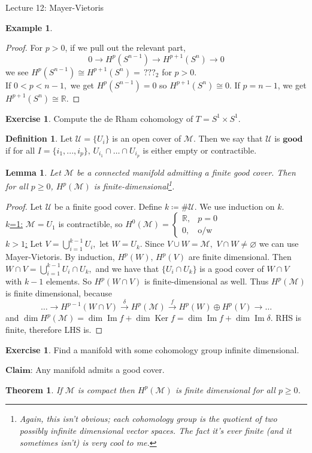 \documentclass[10pt]{article}
\theoremstyle{plain}
\newtheorem{theorem}{Theorem}[section]
\newtheorem{lemma}[thm]{Lemma}
\theoremstyle{definition}
\newtheorem{defn}[thm]{Definition} %
\newtheorem{exmp}[thm]{Example} %
\newtheorem{exercise}[thm]{Exercise}
\newcommand{\Claim}{\textbf{Claim: }}
\newcommand{\Real}{\mathbb{R}}
\newcommand{\man}{\mathcal{M}}
\newcommand{\allthe}[3]{{#1}_{#2},...,{#1}_{#3}}
\DeclareMathOperator{\Ker}{Ker}
\DeclareMathOperator{\Ima}{Im}
\newcommand{\cohomman}[1]{H^{#1}(\man)}
\newcommand{\cohom}[2]{H^{#1}(#2)}
\begin{document}
\begin{section}{Lecture 12: Mayer-Vietoris}
\begin{exmp}
\begin{proof}
For $p>0$, if we pull out the relevant part,
$$ 0 \to \cohom{p}{S^{n-1}} \to \cohom{p+1}{S^n} \to 0$$
we see $\cohom{p}{S^{n-1}} \cong \cohom{p+1}{S^n}  = \, ???_2$ for $p > 0$. \\
If $ 0 < p < n-1,$ we get $\cohom{p}{S^{n-1}} = 0$ so $\cohom{p+1}{S^n} \cong 0$. If $p = n-1$, we get $\cohom{p+1}{S^n} \cong \Real$.
\end{proof}
\end{exmp}

\begin{exercise}
Compute the de Rham cohomology of $T = S^1 \times S^1$.
\end{exercise} 
\begin{defn}
Let $\mathcal{U} = \{U_i\}$ is an open cover of $\man$. Then we say that $\mathcal{U}$ is $\textbf{good}$ if for all $I = \{\allthe{i}{1}{p}\}, \, U_{i_1} \cap \dots \cap U_{i_p}$ is either empty or contractible.
\end{defn}
\begin{lemma}
Let $\man$ be a connected manifold admitting a finite good cover. Then for all $p\geq 0$, $\cohomman{p}$ is finite-dimensional\footnote{Again, this isn't obvious; each cohomology group is the quotient of two possibly infinite dimensional vector spaces. The fact it's ever finite (and it sometimes isn't) is very cool to me.}.
\end{lemma}
\begin{proof}
Let $\mathcal{U}$ be a finite good cover. Define $k \coloneqq \# \mathcal{U}.$ We use induction on $k$.\\
\underline{$k$=1:} $\man = U_1$ is contractible, so $\cohomman{0} = \begin{cases} \Real,& p = 0 \\ 0, & \text{o/w} \end{cases}$\\
\underline{$k>1$:} Let $V = \bigcup\limits_{i=1}^{k-1} U_i,$ let $W =U_k $. Since $V\cup W = \man,$ $V\cap W \neq \varnothing$ we can use Mayer-Vietoris. By induction, $H^p(W), \, \cohom{p}{V}$ are finite dimensional. Then $W\cap V = \bigcup\limits_{i=1}^{k-1} U_i \cap U_k,$ and we have that $\{U_i \cap U_k\}$ is a good cover of $W\cap V$ with $k-1$ elements. So $\cohom{p}{W\cap V}$ is finite-dimensional as well. Thus $\cohomman{p}$ is finite dimensional, because
$$\dots \to \cohom{p-1}{W\cap V} \xrightarrow{\delta}\cohomman{p} \xrightarrow{f} \cohom{p}{W} \oplus \cohom{p}{V} \to \dots$$
and $\dim \cohomman{p} = \dim \Ima f + \dim \Ker f = \dim \Ima f + \dim \Ima \delta.$ RHS is finite, therefore LHS is.
\end{proof}
\begin{exercise}
Find a manifold with some cohomology group infinite dimensional.
\end{exercise}\noindent
$\Claim$Any manifold admits a good cover.
\begin{theorem}
If $\man$ is compact then $\cohomman{p}$ is finite dimensional for all $p\geq 0$.
\end{theorem}
\end{section}
\end{document}

